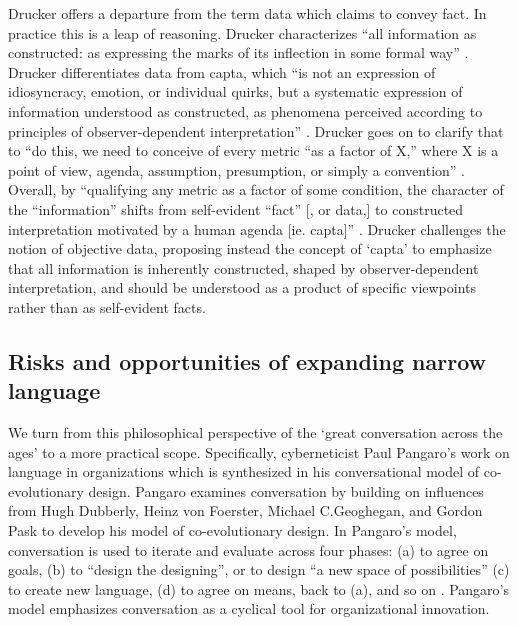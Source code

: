 Drucker offers a departure from the term data which claims to convey fact. In practice this is a leap of reasoning. Drucker characterizes ``all information as constructed: as expressing the marks of its inflection in some formal way” \citep[p. 130]{drucker_graphesis_2014}. Drucker differentiates data from capta, which ``is not an expression of idiosyncracy, emotion, or individual quirks, but a systematic expression of information understood as constructed, as phenomena perceived according to principles of observer-dependent interpretation” \citep[p. 131]{drucker_graphesis_2014}. Drucker goes on to clarify that to ``do this, we need to conceive of every metric ``as a factor of X,” where X is a point of view, agenda, assumption, presumption, or simply a convention” \citep[p. 131]{drucker_graphesis_2014}. Overall, by ``qualifying any metric as a factor of some condition, the character of the ``information” shifts from self-evident ``fact” [, or data,] to constructed interpretation motivated by a human agenda [ie. capta]” \citep[p. 131]{drucker_graphesis_2014}. Drucker challenges the notion of objective data, proposing instead the concept of `capta’ to emphasize that all information is inherently constructed, shaped by observer-dependent interpretation, and should be understood as a product of specific viewpoints rather than as self-evident facts.


\subsection{Risks and opportunities of expanding narrow language}
We turn from this philosophical perspective of the `great conversation across the ages’ to a more practical scope. Specifically, cyberneticist Paul Pangaro’s work on language in organizations which is synthesized in his conversational model of co-evolutionary design. Pangaro examines conversation by building on influences from Hugh Dubberly, Heinz von Foerster, Michael C.Geoghegan, and Gordon Pask to develop his model of co-evolutionary design. In Pangaro’s model, conversation is used to iterate and evaluate across four phases: (a) to agree on goals, (b) to ``design the designing”, or to design ``a new space of possibilities” (c) to create new language, (d) to agree on means, back to (a), and so on \citep[p. 185]{pangaro_design_2011}. Pangaro’s model emphasizes conversation as a cyclical tool for organizational innovation.

